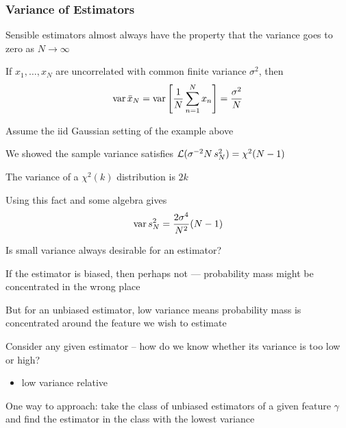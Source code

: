 \begin{frame}\frametitle{Variance of Estimators}

    \vspace{2em}
    Sensible estimators almost always have the property that 
    the variance goes to zero as $N \to \infty$
    
    \vspace{.7em}
    \Eg
    If $x_1,\ldots, x_N$ are uncorrelated with common
    finite variance $\sigma^2$, then 
    \begin{equation}
        \label{eq:varsm}
        \operatorname{var} \bar x_N
        = \operatorname{var} \left[ \frac{1}{N} \sum_{n=1}^N x_n \right]
        = \frac{\sigma^2}{N}
    \end{equation}

\end{frame}

\begin{frame}
    
    \vspace{2em}
    \Eg
    Assume the {\sc iid} Gaussian setting of the example above
    
    We showed the sample variance satisfies $\mathcal L(\sigma^{-2} N
    \, s^2_N) = \chi^2(N - 1)$
    
    The variance of a $\chi^2(k)$
    distribution is $2k$
    
    Using this fact and some algebra gives
    \begin{equation*}
        \operatorname{var}  s^2_N  = \frac{2 \sigma^4}{N^2} (N - 1)
    \end{equation*}
\end{frame}

\begin{frame}

    \vspace{2em}
    Is small variance always desirable for an estimator? 
    
    \vspace{.7em}
    If the estimator is
    biased, then perhaps not --- probability mass might be concentrated in the
    wrong place
    
    \vspace{.7em}
    But for an unbiased estimator, low variance
    means probability mass is concentrated around the feature we wish to
    estimate
\end{frame}

\begin{frame}

    \vspace{2em}
    Consider any given estimator -- how do we know whether its
    variance is too low or high? 
    \begin{itemize}
        \item low variance relative
    \end{itemize}
    
    \vspace{.7em}
    One way to approach: take the class of unbiased estimators 
    of a given feature $\gamma$ and find
    the estimator in the class with the lowest variance
    
\end{frame}

